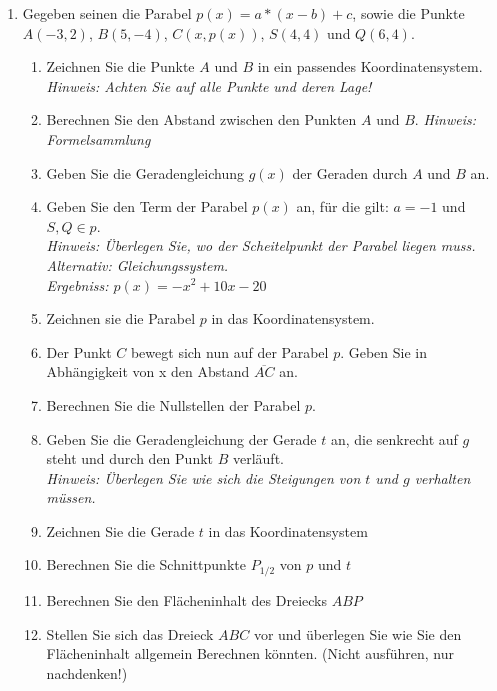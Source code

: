 \documentclass{scrartcl}
\begin{document}
	\begin{enumerate}
		\item Gegeben seinen die Parabel $p(x) = a*(x-b)+c$, sowie die Punkte $A (-3,2)$, $B(5,-4)$, $C(x,p(x))$, $S(4,4)$ und  $Q(6,4)$.
			\begin{enumerate}
				\item Zeichnen Sie die Punkte $A$ und $B$ in ein passendes Koordinatensystem. \\ \emph{Hinweis: Achten Sie auf alle Punkte und deren Lage!}
				\item Berechnen Sie den Abstand zwischen den Punkten $A$ und $B$. \emph{Hinweis: Formelsammlung}
				\item Geben Sie die Geradengleichung $g(x)$ der Geraden durch $A$ und $B$ an.
				\item Geben Sie den Term der Parabel $p(x)$ an, für die gilt: $a=-1$ und $S,Q \in p$. \\ \emph{Hinweis: Überlegen Sie, wo der Scheitelpunkt der Parabel liegen muss. Alternativ: Gleichungssystem. \\ Ergebniss: $p(x) = -x^2 +10x-20$}
				\item Zeichnen sie die Parabel $p$ in das Koordinatensystem.
				\item Der Punkt $C$ bewegt sich nun auf der Parabel $p$. Geben Sie in Abhängigkeit von x den Abstand $\overline{AC}$ an.
				\item Berechnen Sie die Nullstellen der Parabel $p$.
				\item Geben Sie die Geradengleichung der Gerade $t$ an, die senkrecht auf $g$ steht und durch den Punkt $B$ verläuft. \\ \emph{Hinweis: Überlegen Sie wie sich die Steigungen von $t$ und $g$ verhalten müssen.}
				\item Zeichnen Sie die Gerade $t$ in das Koordinatensystem
				\item Berechnen Sie die Schnittpunkte $P_{1/2}$ von $p$ und $t$
				\item Berechnen Sie den Flächeninhalt des Dreiecks $ABP$
				\item Stellen Sie sich das Dreieck $ABC$ vor und überlegen Sie wie Sie den Flächeninhalt allgemein Berechnen könnten. (Nicht ausführen, nur nachdenken!)
			\end{enumerate}
		
	\end{enumerate}
			
\end{document}
